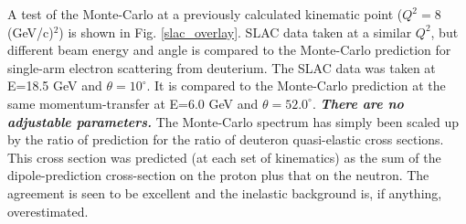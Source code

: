\documentclass[12pt,letterpaper,oneside]{article}
\begin{document}
A test of the Monte-Carlo at a previously calculated kinematic point 
($Q^2=8$ (GeV/c)$^2$) is shown in Fig. \ref{slac_overlay}.
SLAC data \cite{SLAC_Rock} taken at a similar $Q^2$, but different
beam energy and angle is compared to the Monte-Carlo prediction
for single-arm electron
scattering from  deuterium.  The SLAC data was taken at  E=18.5 GeV
and $\theta=10^\circ$.  It  is compared
to the Monte-Carlo prediction at the same momentum-transfer at E=6.0
GeV and
$\theta=52.0^\circ$.  {\em\bf There are no adjustable parameters.}  The
Monte-Carlo spectrum has simply been scaled up by the ratio of
prediction for the ratio of deuteron quasi-elastic cross sections.
This cross section was predicted (at each set of kinematics) as the
sum of the dipole-prediction cross-section on the proton plus that on
the neutron.  The agreement is seen to be excellent and the inelastic
background is, if anything, overestimated.



\end{document}
